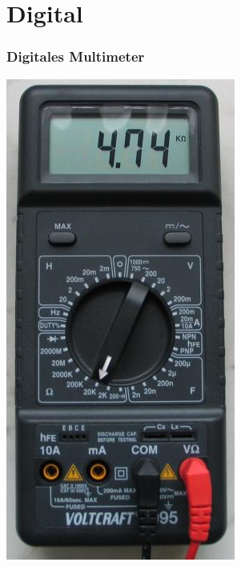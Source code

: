\section*{Digital}

\begin{frame}
    \frametitle{Digitales Multimeter}
    \begin{center}
        \includegraphics[width=.35\textwidth,height=.9\textheight,keepaspectratio]{e17/digitalmultimeter.jpg}
	\end{center}
\end{frame}

